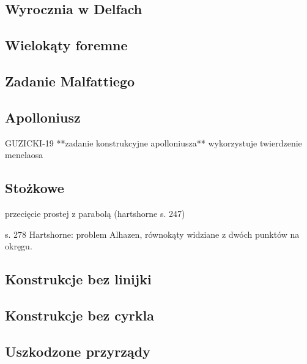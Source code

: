 \subsection{Wyrocznia w Delfach}


\subsection{Wielokąty foremne}


\subsection{Zadanie Malfattiego}


\subsection{Apolloniusz}
GUZICKI-19 **zadanie konstrukcyjne apolloniusza** wykorzystuje twierdzenie menelaosa



\subsection{Stożkowe}
przecięcie prostej z parabolą (hartshorne s. 247)

s. 278 Hartshorne: problem Alhazen, równokąty widziane z dwóch punktów na okręgu.

\subsection{Konstrukcje bez linijki}




\subsection{Konstrukcje bez cyrkla}


\subsection{Uszkodzone przyrządy}


%


